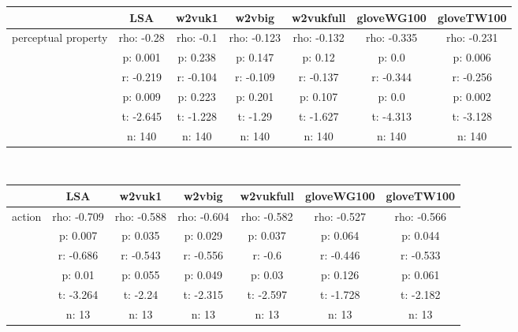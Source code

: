 \documentclass{article}
\begin{document}
\begin{tabular}{ccccccc|}\cline{2-7}
&\multicolumn{1}{|c}{LSA} & w2vuk1 & w2vbig & w2vukfull & gloveWG100 & gloveTW100 \\\hline
\multicolumn{1}{|c|}{\multirow{6}{*}{perceptual property}} & rho: -0.28 & rho: -0.1 & rho: -0.123 & rho: -0.132 & rho: -0.335 & rho: -0.231 \\
\multicolumn{1}{|c|}{} & p: 0.001 & p: 0.238 & p: 0.147 & p: 0.12 & p: 0.0 & p: 0.006 \\
\multicolumn{1}{|c|}{} & r: -0.219 & r: -0.104 & r: -0.109 & r: -0.137 & r: -0.344 & r: -0.256 \\
\multicolumn{1}{|c|}{} & p: 0.009 & p: 0.223 & p: 0.201 & p: 0.107 & p: 0.0 & p: 0.002 \\
\multicolumn{1}{|c|}{} & t: -2.645 & t: -1.228 & t: -1.29 & t: -1.627 & t: -4.313 & t: -3.128 \\
\multicolumn{1}{|c|}{} & n: 140 & n: 140 & n: 140 & n: 140 & n: 140 & n: 140 \\
\hline
\end{tabular}\\
\begin{tabular}{ccccccc|}\cline{2-7}
&\multicolumn{1}{|c}{LSA} & w2vuk1 & w2vbig & w2vukfull & gloveWG100 & gloveTW100 \\\hline
\multicolumn{1}{|c|}{\multirow{6}{*}{action}} & rho: -0.709 & rho: -0.588 & rho: -0.604 & rho: -0.582 & rho: -0.527 & rho: -0.566 \\
\multicolumn{1}{|c|}{} & p: 0.007 & p: 0.035 & p: 0.029 & p: 0.037 & p: 0.064 & p: 0.044 \\
\multicolumn{1}{|c|}{} & r: -0.686 & r: -0.543 & r: -0.556 & r: -0.6 & r: -0.446 & r: -0.533 \\
\multicolumn{1}{|c|}{} & p: 0.01 & p: 0.055 & p: 0.049 & p: 0.03 & p: 0.126 & p: 0.061 \\
\multicolumn{1}{|c|}{} & t: -3.264 & t: -2.24 & t: -2.315 & t: -2.597 & t: -1.728 & t: -2.182 \\
\multicolumn{1}{|c|}{} & n: 13 & n: 13 & n: 13 & n: 13 & n: 13 & n: 13 \\
\hline
\end{tabular}\\
\end{document}
